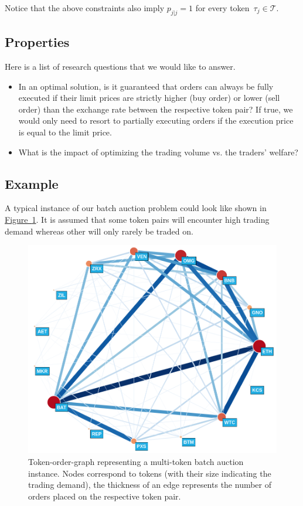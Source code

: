 \documentclass[11pt,parskip=full]{scrartcl}%
\newcommand*{\tokens}{\mathcal{T}}          %
\newcommand*{\figref}[1]{\hyperref[{#1}]{Figure~\ref*{#1}}}
\begin{document}
Notice that the above constraints also imply $ p_{j|j} = 1 $ for every
token~$ \tau_j \in \tokens $.

\subsection{Properties}
\label{subsec:properties}

Here is a list of research questions that we would like to answer.

\begin{itemize}
  \item In an optimal solution, is it guaranteed that orders can always be fully executed if their
  limit prices are strictly higher (buy order) or lower (sell order) than the exchange rate between
  the respective token pair?
  If true, we would only need to resort to partially executing orders if the execution price is
  equal to the limit price.
  \item What is the impact of optimizing the trading volume vs. the traders' welfare?
\end{itemize}


\subsection{Example}
\label{subsec:example}

A typical instance of our batch auction problem could look like shown in 
\figref{fig:order-token-graph}.
It is assumed that some token pairs will encounter high trading demand whereas other will only
rarely be traded on.

\begin{figure}[h!]
  \centering
  \includegraphics[width=.82\textwidth]{figures/token_order_graph.png}
  \caption{Token-order-graph representing a multi-token batch auction instance. Nodes correspond
  to tokens (with their size indicating the trading demand), the thickness of an edge represents 
  the number of orders placed on the respective token pair.}
  \label{fig:order-token-graph}
\end{figure}
\end{document}
